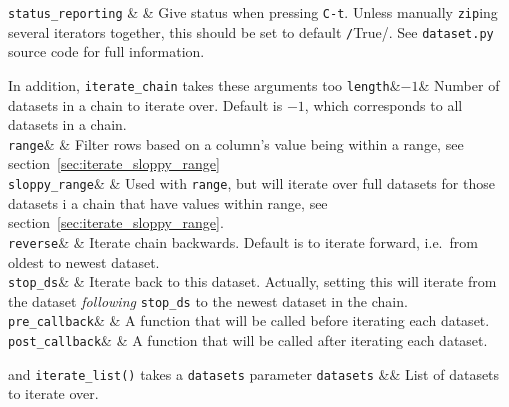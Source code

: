   

  \RP \texttt{status\_reporting} & \pyTrue & Give status when
  pressing \texttt{C-t}.  Unless manually \texttt{zip}ing several
  iterators together, this should be set to
  default \texttt/True/.  See \texttt{dataset.py} source
  code for full information.\\
\stoptable

\noindent In addition, \texttt{iterate\_chain} takes these arguments too
\starttable
  \RP \texttt{length}&$-1$& Number of datasets in a chain to iterate
  over.  Default is $-1$, which corresponds to all datasets in a
  chain.\\[1ex]
  
  \RP \texttt{range}& \pyNone& Filter rows based on a column's value
  being within a range, see
  section~\ref{sec:iterate_sloppy_range}\\[1ex]

  \RP \texttt{sloppy\_range}& \pyFalse & Used with \texttt{range}, but
  will iterate over full datasets for those datasets i a chain that
  have values within range, see
  section~\ref{sec:iterate_sloppy_range}.\\[1ex]
  
  \RP \texttt{reverse}& \pyFalse & Iterate chain backwards.  Default
  is to iterate forward, i.e.\ from oldest to newest dataset.\\[1ex]

  \RP \texttt{stop\_ds}& \pyNone & Iterate back to this dataset.
  Actually, setting this will iterate from the dataset
  \textsl{following} \texttt{stop\_ds} to the newest dataset in the
  chain.\\[1ex]

  \RP \texttt{pre\_callback}& \pyNone & A function that will be called
  before iterating each dataset.\\[1ex]

  \RP \texttt{post\_callback}& \pyNone & A function that will be
  called after iterating each dataset.\\
\stoptable

\noindent and \texttt{iterate\_list()} takes a \texttt{datasets} parameter
\starttable
  \RP \texttt{datasets} &\pyNone& List of datasets to iterate over.\\
\stoptable



